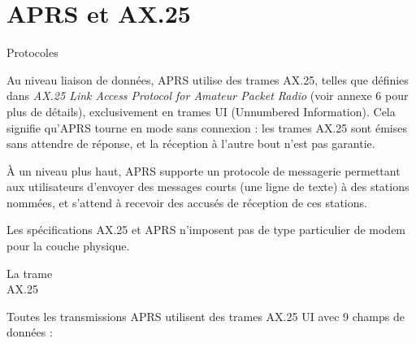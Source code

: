 \chapter[APRS ET AX.25]{APRS et AX.25}\label{aprs-et-ax.25}

\begin{aprssideblock}{Protocoles}
\label{protocoles}
Au niveau liaison de données, APRS utilise des trames AX.25, telles que
définies dans \emph{AX.25 Link Access Protocol for Amateur Packet Radio}
(voir annexe 6 pour plus de détails), exclusivement en trames UI
(Unnumbered Information). Cela signifie qu'APRS tourne en mode sans
connexion : les trames AX.25 sont émises sans attendre de réponse, et la
réception à l'autre bout n'est pas garantie.

À un niveau plus haut, APRS supporte un protocole de messagerie
permettant aux utilisateurs d'envoyer des messages courts (une ligne de
texte) à des stations nommées, et s'attend à recevoir des accusés de
réception de ces stations.

Les spécifications AX.25 et APRS n'imposent pas de type particulier de
modem pour la couche physique.
\end{aprssideblock}

\begin{aprssideblock}{La trame\\AX.25}
\label{la-trame-ax.25}
Toutes les transmissions APRS utilisent des trames AX.25 UI avec 9
champs de données :
\end{aprssideblock}

